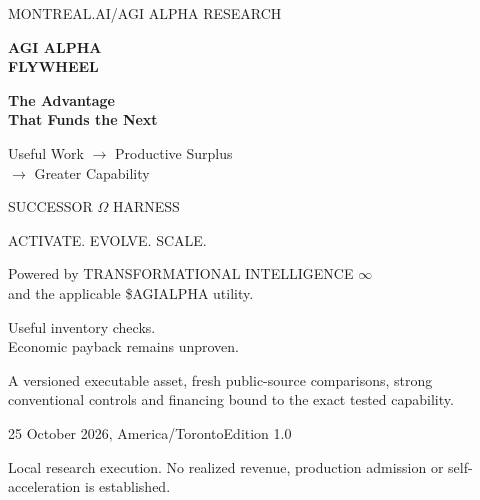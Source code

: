 \documentclass[11pt,a4paper]{article}
\begin{document}
\begin{titlepage}\thispagestyle{empty}
\color{white}\sffamily
\vspace*{1cm}
{\small\color{gold} MONTREAL.AI\quad /\quad AGI ALPHA RESEARCH}\par
\vspace{1.5cm}
{\Huge\bfseries AGI ALPHA\\[0.15em] FLYWHEEL}\par
\vspace{1cm}
{\fontsize{29}{35}\selectfont\bfseries The Advantage\\That Funds the Next}\par
\vspace{0.7cm}
{\Large Useful Work $\rightarrow$ Productive Surplus\\[0.3em] $\rightarrow$ Greater Capability}\par
\vspace{1.2cm}
{\large SUCCESSOR $\Omega$ HARNESS}\par
{\small ACTIVATE. EVOLVE. SCALE.}\par
\vspace{0.4cm}
{\small Powered by TRANSFORMATIONAL INTELLIGENCE $\infty$\\and the applicable \$AGIALPHA utility.}\par
\vfill
\begin{minipage}{0.93\linewidth}\raggedright
\color{lavender}\large Useful inventory checks.\\Economic payback remains unproven.\par
\vspace{0.5cm}\normalsize
A versioned executable asset, fresh public-source comparisons, strong conventional
controls and financing bound to the exact tested capability.\par
\vspace{0.5cm}\small
25 October 2026, America/Toronto\quad Edition 1.0\par
Local research execution. No realized revenue, production admission or
self-acceleration is established.
\end{minipage}
\end{titlepage}
\end{document}
